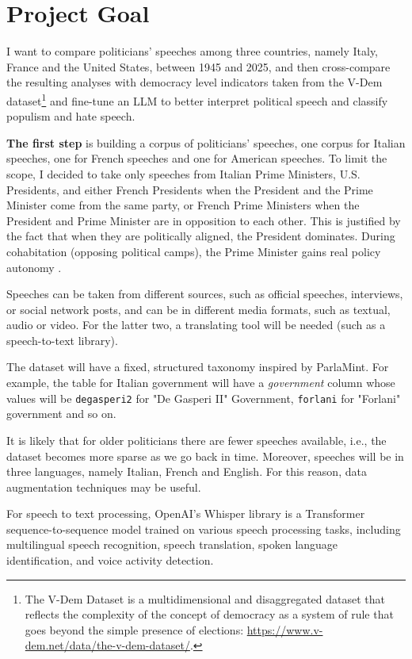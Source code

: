 \section{Project Goal}

I want to compare politicians' speeches among three countries, namely Italy, France and the United States, between 1945 and 2025, and then cross-compare the resulting analyses with democracy level indicators taken from the V-Dem dataset\footnote{The V-Dem Dataset is a multidimensional and disaggregated dataset that reflects the complexity of the concept of democracy as a system of rule that goes beyond the simple presence of elections: \url{https://www.v-dem.net/data/the-v-dem-dataset/}.} and fine-tune an LLM to better interpret political speech and classify populism and hate speech.

\textbf{The first step} is building a corpus of politicians' speeches, one corpus for Italian speeches, one for French speeches and one for American speeches. To limit the scope, I decided to take only speeches from Italian Prime Ministers, U.S. Presidents, and either French Presidents when the President and the Prime Minister come from the same party, or French Prime Ministers when the President and Prime Minister are in opposition to each other. This is justified by the fact that when they are politically aligned, the President dominates. During cohabitation (opposing political camps), the Prime Minister gains real policy autonomy \cite{north_french_nodate}.

Speeches can be taken from different sources, such as official speeches, interviews, or social network posts, and can be in different media formats, such as textual, audio or video. For the latter two, a translating tool will be needed (such as a speech-to-text library).

The dataset will have a fixed, structured taxonomy inspired by ParlaMint. For example, the table for Italian government will have a \textit{government} column whose values will be \texttt{degasperi2} for "De Gasperi II" Government, \texttt{forlani} for "Forlani" government and so on.

It is likely that for older politicians there are fewer speeches available, i.e., the dataset becomes more sparse as we go back in time. Moreover, speeches will be in three languages, namely Italian, French and English. For this reason, data augmentation techniques may be useful.

For speech to text processing, OpenAI's Whisper library is a Transformer sequence-to-sequence model trained on various speech processing tasks, including multilingual speech recognition, speech translation, spoken language identification, and voice activity detection. 

